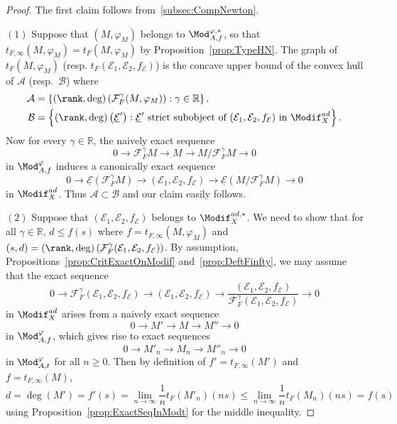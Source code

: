\begin{proof}
The first claim follows from~\ref{subsec:CompNewton}.

$(1)$
Suppose that $(M,\varphi_{M})$ belongs to $\Mod_{A,f}^{\varphi,\ast}$, so that $t_{F,\infty}(M,\varphi_{M})=t_{F}(M,\varphi_{M})$ by Proposition~\ref{prop:TypeHN}. The graph of $t_{F}(M,\varphi_{M})$ (resp. $t_{F}(\mathcal{E}_{1},\mathcal{E}_{2},f_{\mathcal{E}})$) is the concave upper bound of the convex hull of $\mathcal{A}$ (resp.~$\mathcal{B}$) where
\begin{align*}
\mathcal{A} & = \left\{ (\rank,\deg)\left(\mathcal{F}_{F}^{\gamma}(M,\varphi_{M})\right):\gamma\in\mathbb{R}\right\},\\
\mathcal{B} & = \left\{ (\rank,\deg)\left(\underline{\mathcal{E}}'\right):\underline{\mathcal{E}}'\text{ strict subobject of }(\mathcal{E}_{1},\mathcal{E}_{2},f_{\mathcal{E}})\text{ in }\Modif_{X}^{ad}\right\}.
\end{align*}
Now for every $\gamma\in\mathbb{R}$, the naively exact sequence
\[
0\rightarrow\mathcal{F}_{F}^{\gamma}M\rightarrow M\rightarrow M/\mathcal{F}_{F}^{\gamma}M\rightarrow0
\]
in $\Mod_{A,f}^{\varphi}$ induces a canonically exact sequence
\[
0\rightarrow\underline{\mathcal{E}}\left(\mathcal{F}_{F}^{\gamma}M\right)\rightarrow(\mathcal{E}_{1},\mathcal{E}_{2},f_{\mathcal{E}})\rightarrow\underline{\mathcal{E}}\left(M/\mathcal{F}_{F}^{\gamma}M\right)\rightarrow0
\]
in $\Modif_{X}^{ad}$. Thus $\mathcal{A}\subset\mathcal{B}$ and our claim easily follows.

$(2)$
Suppose that $(\mathcal{E}_{1},\mathcal{E}_{2},f_{\mathcal{E}})$ belongs to $\Modif_{X}^{ad,\ast}$. We need to show that for all $\gamma\in\mathbb{R}$, $d\leq f(s)$ where $f=t_{F,\infty}(M,\varphi_{M})$ and $(s,d)=(\rank,\deg)\left(\mathcal{F}_{F}^{\gamma}(\mathcal{E}_{1},\mathcal{E}_{2},f_{\mathcal{E}})\right)$. By assumption, Propositions~\ref{prop:CritExactOnModif} and~\ref{prop:DeftFinfty}, we may assume that the exact sequence
\[
0\rightarrow\mathcal{F}_{F}^{\gamma}(\mathcal{E}_{1},\mathcal{E}_{2},f_{\mathcal{E}})\rightarrow(\mathcal{E}_{1},\mathcal{E}_{2},f_{\mathcal{E}})\rightarrow\frac{(\mathcal{E}_{1},\mathcal{E}_{2},f_{\mathcal{E}})}{\mathcal{F}_{F}^{\gamma}(\mathcal{E}_{1},\mathcal{E}_{2},f_{\mathcal{E}})}\rightarrow0
\]
in $\Modif_{X}^{ad}$ arises from a naively exact sequence
\[
0\rightarrow M'\rightarrow M\rightarrow M''\rightarrow0
\]
in $\Mod_{A,f}^{\varphi}$, which gives rise to exact sequences
\[
0\rightarrow M'_{n}\rightarrow M_{n}\rightarrow M''_{n}\rightarrow0
\]
in $\Mod_{A,t}^{\varphi}$ for all $n\geq0$. Then by definition of $f'=t_{F,\infty}(M')$ and $f=t_{F,\infty}(M)$,
\[
d=\deg(M')=f'(s)=\lim_{n\rightarrow\infty}{\frac{1}{n}}t_{F}(M'_{n})(ns)\leq\lim_{n\rightarrow\infty}{\frac{1}{n}}t_{F}(M{}_{n})(ns)=f(s)
\]
using Proposition~\ref{prop:ExactSeqInModt} for the middle inequality.


\end{proof}
